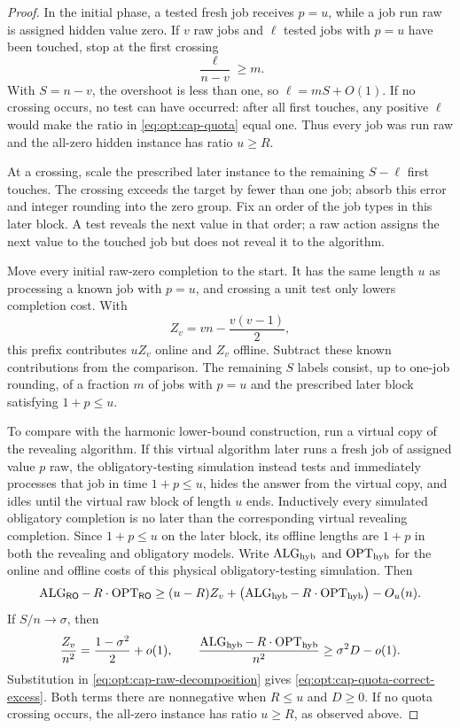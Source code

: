 \begin{proof}
In the initial phase, a tested fresh job receives $p=u$, while a job run raw
is assigned hidden value zero.  If $v$ raw jobs and $\ell$ tested jobs with
$p=u$ have
been touched, stop at the first crossing
\begin{equation}
 \frac{\ell}{n-v}\ge m.
 \label{eq:opt:cap-quota}
\end{equation}
With $S=n-v$, the overshoot is less than one, so $\ell=mS+O(1)$.  If no
crossing occurs, no test can have occurred: after all first touches, any
positive $\ell$ would make the ratio in \cref{eq:opt:cap-quota} equal one.
Thus every job was run raw and the all-zero hidden instance has ratio
$u\ge R$.

At a crossing, scale the prescribed later instance to the remaining
$S-\ell$ first touches.  The crossing exceeds the target by fewer than one
job; absorb this error and integer rounding into the zero group.  Fix an
order of the job types in this later
block.  A test reveals the next value in that order; a raw action assigns the
next value to the touched job but does not reveal it to the algorithm.

Move every initial raw-zero completion to the start.  It has the same length
$u$ as processing a known job with $p=u$, and crossing a unit test only
lowers completion cost.
With
\begin{equation}
 Z_v=vn-\frac{v(v-1)}2,
\end{equation}
this prefix contributes $uZ_v$ online and $Z_v$ offline.  Subtract these
known contributions from the comparison.  The
remaining $S$ labels consist, up to one-job rounding, of a fraction $m$ of
jobs with $p=u$ and the prescribed later block satisfying $1+p\le u$.

To compare with the harmonic lower-bound construction, run a virtual copy of
the revealing algorithm.  If this virtual algorithm later runs a fresh job
of assigned value $p$ raw, the obligatory-testing simulation instead tests
and
immediately processes that job in time $1+p\le u$, hides the answer from the
virtual copy, and idles until the virtual raw block of length $u$ ends.
Inductively every simulated obligatory completion is no later than the
corresponding virtual revealing completion.  Since $1+p\le u$ on the later
block, its offline lengths are $1+p$ in both the revealing and obligatory
models.  Write $\operatorname{ALG}_{\rm hyb}$ and $\operatorname{OPT}_{\rm hyb}$ for the online and
offline costs
of this physical obligatory-testing simulation.  Then
\begin{equation}
 \operatorname{ALG}_{\mathsf{RO}}-\,R\cdot\operatorname{OPT}_{\mathsf{RO}}
 \ge (u-R)Z_v+
 \bigl(\operatorname{ALG}_{\rm hyb}-\,R\cdot\operatorname{OPT}_{\rm hyb}\bigr)-O_u(n).
 \label{eq:opt:cap-raw-decomposition}
\end{equation}
If $S/n\to\sigma$, then
\[
 \frac{Z_v}{n^2}=\frac{1-\sigma^2}{2}+o(1),
 \qquad
 \frac{\operatorname{ALG}_{\rm hyb}-\,R\cdot\operatorname{OPT}_{\rm hyb}}{n^2}
 \ge \sigma^2D-o(1).
\]
Substitution in \cref{eq:opt:cap-raw-decomposition} gives
\cref{eq:opt:cap-quota-correct-excess}.  Both terms there are nonnegative
when $R\le u$ and $D\ge0$.  If no quota crossing occurs, the all-zero
instance has ratio $u\ge R$, as observed above.


\end{proof}
